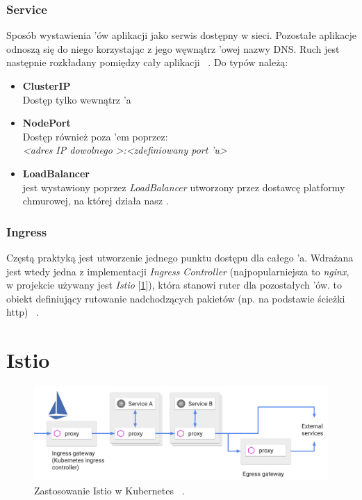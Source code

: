 \subsubsection{Service}
Sposób wystawienia 'ów aplikacji jako serwis dostępny w sieci. Pozostałe aplikacje odnoszą się do niego korzystając z jego węwnątrz 'owej nazwy DNS.
Ruch jest następnie rozkładany pomiędzy cały  aplikacji ~\cite{k8s-cpts}. Do typów  należą: 

\begin{itemize}
    \item
    \textbf{ClusterIP}\\
    Dostęp tylko wewnątrz 'a
    
    \item
    \textbf{NodePort}\\
    Dostęp również poza 'em poprzez:\\ 
    \emph{<adres IP dowolnego }\emph{>:<zdefiniowany port }\emph{'u>}

    \item
    \textbf{LoadBalancer}\\
     jest wystawiony poprzez \emph{LoadBalancer} utworzony przez dostawcę platformy chmurowej, na której działa nasz .
\end{itemize} 


\subsubsection{Ingress}
Częstą praktyką jest utworzenie jednego punktu dostępu dla całego ’a. 
Wdrażana jest wtedy jedna z implementacji \emph{Ingress Controller} (najpopularniejsza to \emph{nginx}, w projekcie używany jest \emph{Istio} [\ref{istio}]), która stanowi ruter dla pozostałych ’ów. 
 to obiekt definiujący rutowanie nadchodzących pakietów (np. na podstawie ścieżki http) ~\cite{k8s-cpts}.


\section{Istio}
\label{istio}

\begin{figure}[!ht]
	\begin{center}
		\includegraphics[width=1\textwidth]{img/istio}
	\end{center}
	\caption{Zastosowanie Istio w Kubernetes ~\cite{istio-traffic}.}
\end{figure}

